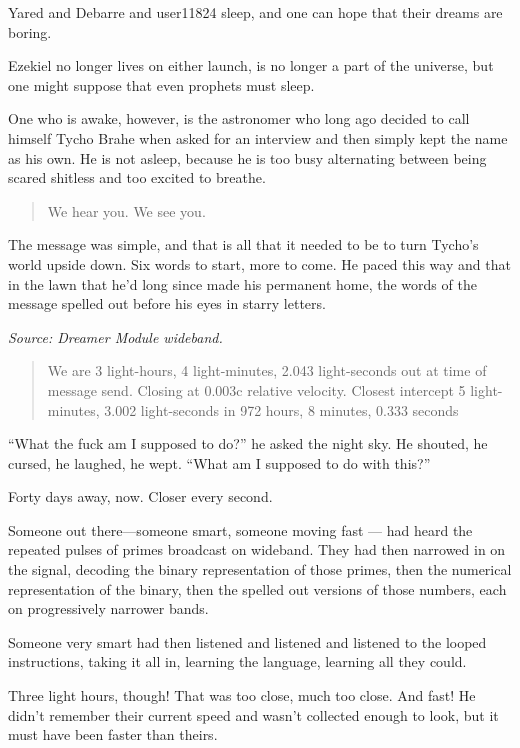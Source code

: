 Yared and Debarre and user11824 sleep, and one can hope that their dreams are boring.

Ezekiel no longer lives on either launch, is no longer a part of the universe, but one might suppose that even prophets must sleep.

One who is awake, however, is the astronomer who long ago decided to call himself Tycho Brahe when asked for an interview and then simply kept the name as his own. He is not asleep, because he is too busy alternating between being scared shitless and too excited to breathe.

\begin{quote}
We hear you. We see you.
\end{quote}

\noindent The message was simple, and that is all that it needed to be to turn Tycho's world upside down. Six words to start, more to come. He paced this way and that in the lawn that he'd long since made his permanent home, the words of the message spelled out before his eyes in starry letters.

\emph{Source: Dreamer Module wideband.}

\begin{quote}
We are 3 light-hours, 4 light-minutes, 2.043 light-seconds out at time of message send. Closing at 0.003c relative velocity. Closest intercept 5 light-minutes, 3.002 light-seconds in 972 hours, 8 minutes, 0.333 seconds
\end{quote}

\noindent ``What the fuck am I supposed to do?'' he asked the night sky. He shouted, he cursed, he laughed, he wept. ``What am I supposed to do with this?''

Forty days away, now. Closer every second.

Someone out there---someone smart, someone moving fast — had heard the repeated pulses of primes broadcast on wideband. They had then narrowed in on the signal, decoding the binary representation of those primes, then the numerical representation of the binary, then the spelled out versions of those numbers, each on progressively narrower bands.

Someone very smart had then listened and listened and listened to the looped instructions, taking it all in, learning the language, learning all they could.

Three light hours, though! That was too close, much too close. And fast! He didn't remember their current speed and wasn't collected enough to look, but it must have been faster than theirs.

